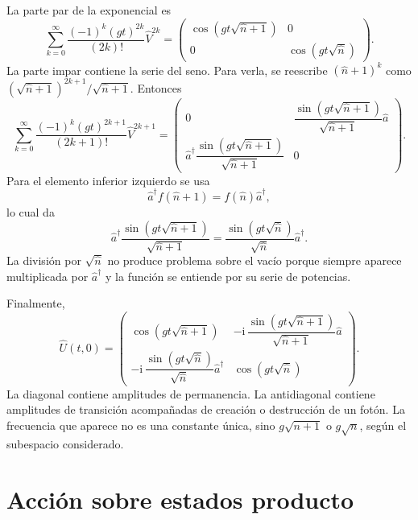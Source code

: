 \documentclass[11pt]{article}
\newcommand{\ii}{\mathrm{i}}
\newcommand{\adag}{\hat a^\dagger}
\newcommand{\nnop}{\hat n}
\begin{document}
La parte par de la exponencial es
\begin{equation}
  \sum_{k=0}^{\infty}
  \frac{(-1)^k(gt)^{2k}}{(2k)!}
  \hat V^{2k}
  =
  \begin{pmatrix}
    \cos(gt\sqrt{\nnop+1}) & 0\\
    0 & \cos(gt\sqrt{\nnop})
  \end{pmatrix}.
\end{equation}
La parte impar contiene la serie del seno. Para verla, se reescribe
$(\nnop+1)^k$ como
$(\sqrt{\nnop+1})^{2k+1}/\sqrt{\nnop+1}$. Entonces
\begin{equation}
  \sum_{k=0}^{\infty}
  \frac{(-1)^k(gt)^{2k+1}}{(2k+1)!}
  \hat V^{2k+1}
  =
  \begin{pmatrix}
    0 &
    \dfrac{\sin(gt\sqrt{\nnop+1})}{\sqrt{\nnop+1}}\hat a\\[10pt]
    \adag\dfrac{\sin(gt\sqrt{\nnop+1})}{\sqrt{\nnop+1}} &
    0
  \end{pmatrix}.
\end{equation}
Para el elemento inferior izquierdo se usa
\begin{equation}
  \adag f(\nnop+1)=f(\nnop)\adag,
\end{equation}
lo cual da
\begin{equation}
  \adag\dfrac{\sin(gt\sqrt{\nnop+1})}{\sqrt{\nnop+1}}
  =
  \dfrac{\sin(gt\sqrt{\nnop})}{\sqrt{\nnop}}\adag.
\end{equation}
La divisi\'on por $\sqrt{\nnop}$ no produce problema sobre el vac\'io porque
siempre aparece multiplicada por $\adag$ y la funci\'on se entiende por su
serie de potencias.

Finalmente,
\begin{equation}
  \boxed{
  \hat U(t,0)
  =
  \begin{pmatrix}
    \cos(gt\sqrt{\nnop+1}) &
    -\ii\,\dfrac{\sin(gt\sqrt{\nnop+1})}{\sqrt{\nnop+1}}\hat a\\[12pt]
    -\ii\,\dfrac{\sin(gt\sqrt{\nnop})}{\sqrt{\nnop}}\adag &
    \cos(gt\sqrt{\nnop})
  \end{pmatrix}.
  }
\end{equation}
La diagonal contiene amplitudes de permanencia. La antidiagonal contiene
amplitudes de transici\'on acompa\~nadas de creaci\'on o destrucci\'on de un
fot\'on. La frecuencia que aparece no es una constante \'unica, sino
$g\sqrt{n+1}$ o $g\sqrt n$, seg\'un el subespacio considerado.

\section{Acci\'on sobre estados producto}
\end{document}
